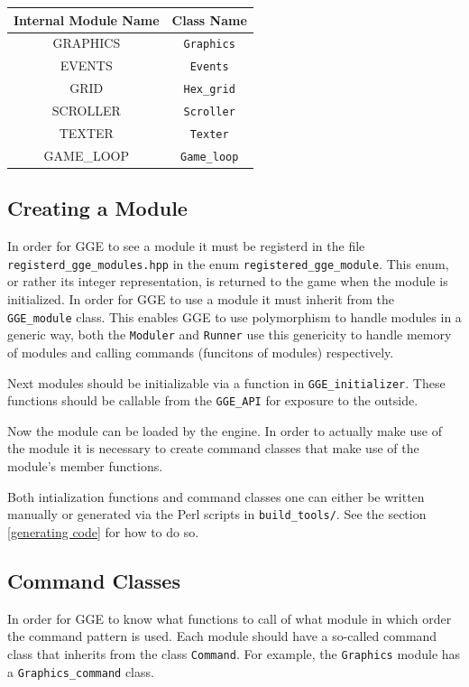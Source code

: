 \begin{tabular}{|c|c||}
	Internal Module Name & Class Name \\
	\hline
	GRAPHICS & \verb|Graphics| \\
	EVENTS & \verb|Events| \\
	GRID & \verb|Hex_grid| \\
	SCROLLER & \verb|Scroller| \\
	TEXTER & \verb|Texter| \\
	GAME\_LOOP & \verb|Game_loop| \\
\end{tabular}

\subsection{Creating a Module} \label{reg modules}
In order for GGE to see a module it must be registerd in the file \verb|registerd_gge_modules.hpp| in the enum \verb|registered_gge_module|. 
This enum, or rather its integer representation, is returned to the game when the module is initialized.
In order for GGE to use a module it must inherit from the \verb|GGE_module| class. This enables GGE to use polymorphism to handle modules in a generic way, both the \verb|Moduler| and \verb|Runner| use this genericity to handle memory of modules
and calling commands (funcitons of modules) respectively.

Next modules should be initializable via a function in \verb|GGE_initializer|.
These functions should be callable from the \verb|GGE_API| for exposure to the outside.

Now the module can be loaded by the engine. In order to actually make use of the module it is necessary to create
command classes that make use of the module's member functions.

Both intialization functions and command classes one can either be written manually or generated via the Perl scripts in \verb|build_tools/|. See the section \ref{generating code} for how to do so.

\subsection{Command Classes} 
In order for GGE to know what functions to call of what module in which order the command pattern is used.
Each module should have a so-called command class that inherits from the class \verb|Command|.
For example, the \verb|Graphics| module has a \verb|Graphics_command| class.

